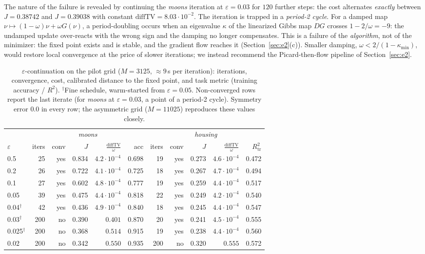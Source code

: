 \documentclass[11pt,leqno]{amsart}
\newcommand{\eps}{\varepsilon}
\numberwithin{equation}{section}
\theoremstyle{definition}
\begin{document}
The nature of the failure is revealed by continuing the \emph{moons}
iteration at $\eps=0.03$ for $120$ further steps: the cost alternates
\emph{exactly} between $J=0.38742$ and $J=0.39038$ with constant
$\mathrm{diffTV}=8.03\cdot10^{-2}$.  The iteration is trapped in a
\emph{period-2 cycle}.  For a damped map $\nu\mapsto(1-\omega)\nu+\omega
G(\nu)$, a period-doubling occurs when an eigenvalue $\kappa$ of the
linearized Gibbs map $DG$ crosses $1-2/\omega=-9$: the undamped update
over-reacts with the wrong sign and the damping no longer compensates.  This
is a failure of the \emph{algorithm}, not of the minimizer: the fixed point
exists and is stable, and the gradient flow reaches it
(Section~\ref{sec:e2}(c)).  Smaller damping, $\omega<2/(1-\kappa_{\min})$,
would restore local convergence at the price of slower iterations; we
instead recommend the Picard-then-flow pipeline of Section~\ref{sec:e2}.

\begin{table}[ht]
\centering\small
\begin{tabular}{l rrrrr @{\qquad} rrrrr}
\toprule
& \multicolumn{5}{c}{\emph{moons}} & \multicolumn{5}{c}{\emph{housing}}\\
$\eps$ & iters & conv & $J$ & $\tfrac{\mathrm{diffTV}}{\omega}$ & acc
       & iters & conv & $J$ & $\tfrac{\mathrm{diffTV}}{\omega}$ & $R^2_{\mathrm{tr}}$\\
\midrule
0.5  & 25  & yes & 0.834 & $4.2\!\cdot\!10^{-4}$ & 0.698 & 19  & yes & 0.273 & $4.6\!\cdot\!10^{-4}$ & 0.472\\
0.2  & 26  & yes & 0.722 & $4.1\!\cdot\!10^{-4}$ & 0.725 & 18  & yes & 0.267 & $4.7\!\cdot\!10^{-4}$ & 0.494\\
0.1  & 27  & yes & 0.602 & $4.8\!\cdot\!10^{-4}$ & 0.777 & 19  & yes & 0.259 & $4.4\!\cdot\!10^{-4}$ & 0.517\\
0.05 & 39  & yes & 0.475 & $4.4\!\cdot\!10^{-4}$ & 0.818 & 22  & yes & 0.249 & $4.2\!\cdot\!10^{-4}$ & 0.540\\
0.04$^\dagger$  & 42  & yes & 0.436 & $4.9\!\cdot\!10^{-4}$ & 0.840 & 18  & yes & 0.245 & $4.4\!\cdot\!10^{-4}$ & 0.547\\
0.03$^\dagger$  & 200 & no  & 0.390 & $0.401$ & 0.870 & 20  & yes & 0.241 & $4.5\!\cdot\!10^{-4}$ & 0.555\\
0.025$^\dagger$ & 200 & no  & 0.368 & $0.514$ & 0.915 & 19  & yes & 0.238 & $4.4\!\cdot\!10^{-4}$ & 0.560\\
0.02 & 200 & no  & 0.342 & $0.550$               & 0.935 & 200 & no  & 0.320 & $0.555$               & 0.572\\
\bottomrule
\end{tabular}
\vskip 2pt
\caption{$\eps$-continuation on the pilot grid ($M=3125$, $\approx9$\,s per
iteration): iterations, convergence, cost, calibrated distance to the fixed
point, and task metric (training accuracy / $R^2$).  $^\dagger$Fine schedule,
warm-started from $\eps=0.05$.  Non-converged rows report the last iterate (for \emph{moons} at $\eps=0.03$,
a point of a period-2 cycle).  Symmetry error $0.0$ in every row; the
asymmetric grid ($M=11025$) reproduces these values closely.}
\label{tab:continuation}
\end{table}
\end{document}
